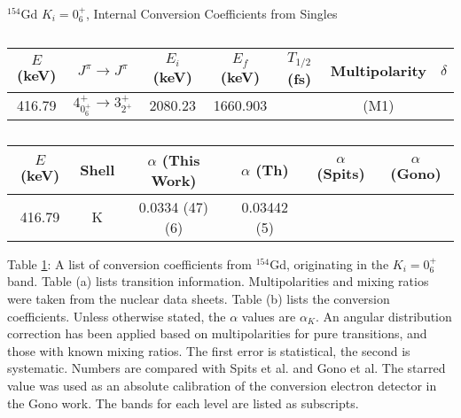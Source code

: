 \begin{table}
    \centering
    \caption{$^{154}$Gd $K_i=0^+_6$, Internal Conversion Coefficients from Singles}
    \label{tab:154Gd_Single_06_Disc}
\begin{ThreePartTable}
    \begin{subtable}{\textwidth}
        \caption{}
    \begin{tabular}{c|c|c|c|c|c|c}
        \toprule
        $E$ (keV)	&	$J^{\pi}	\rightarrow	J^{\pi}$	&	$E_i$ (keV)	&	$E_f$ (keV)	&	$T_{1/2}$ (fs)	&	Multipolarity	&	$\delta$\\
        \hline
        416.79	&	$4^+_{0^+_6}	\rightarrow	3^+_{2^+}$	&	2080.23	&	1660.903	&		&	(M1)	&	\\
        \bottomrule
    \end{tabular}
    \end{subtable}
    \end{ThreePartTable}
\end{table}
\begin{table}
    \ContinuedFloat
    \begin{subtable}{\textwidth}
    \end{subtable}
    \begin{ThreePartTable}
    \begin{subtable}{\textwidth}
        \caption{}
        \begin{tabular}{c|c|c|c|c|c}
            \toprule
            $E$ (keV) & Shell &	$\alpha$ (This Work)	&	$\alpha$  (Th)\citep{kibedi08:_BRICC}	&	$\alpha$ (Spits)\citep{spits96:_154gd} & $\alpha$ (Gono)\citep{gono74:_154gd_e0}		\\
            \hline
            416.79	 & K &	0.0334	(47) (6)	&	0.03442 (5)	&	\\
            \bottomrule
        \end{tabular}
        \end{subtable}
        \begin{tablenotes}[para]
            Table \ref{tab:154Gd_Single_06_Disc}: A list of conversion coefficients from $^{154}$Gd, originating in the $K_i=0^+_6$ band. Table (a) lists transition information. Multipolarities and mixing ratios were taken from the nuclear data sheets\citep{reich09:_nds_154}. Table (b) lists the conversion coefficients. Unless otherwise stated, the $\alpha$ values are $\alpha_K$. An angular distribution correction has been applied based on multipolarities for pure transitions, and those with known mixing ratios. The first error is statistical, the second is systematic. Numbers are compared with Spits et al.\citep{spits96:_154gd} and Gono et al.\citep{gono74:_154gd_e0} The starred value was used as an absolute calibration of the conversion electron detector in the Gono work. The bands for each level are listed as subscripts.
        \end{tablenotes}
\end{ThreePartTable}
\end{table}
